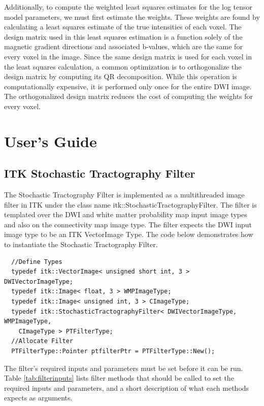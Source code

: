 \documentclass{InsightArticle}
\begin{document}
Additionally, to compute the weighted least squares estimates for the log tensor model parameters, we must first estimate the weights.  These weights are found by calculating a least squares estimate of the true intensities of each voxel.  The design matrix used in this least squares estimation is a function solely of the magnetic gradient directions and associated b-values, which are the same for every voxel in the image.  Since the same design matrix is used for each voxel in the least squares calculation, a common optimization is to orthogonalize the design matrix by computing its QR decomposition.  While this operation is computationally expensive, it is performed only once for the entire DWI image.  The orthogonalized design matrix reduces the cost of computing the weights for every voxel.


\section{User's Guide}

\subsection{ITK Stochastic Tractography Filter}
The Stochastic Tractography Filter is implemented as a multithreaded image filter in ITK under the class name itk::StochasticTractographyFilter.  The filter is templated over the DWI and white matter probability map input image types and also on the connectivity map image type.  The filter expects the DWI input image type to be an ITK VectorImage Type.  The code below demonstrates how to instantiate the Stochastic Tractography Filter.
\begin{verbatim}
  //Define Types
  typedef itk::VectorImage< unsigned short int, 3 > DWIVectorImageType;
  typedef itk::Image< float, 3 > WMPImageType;
  typedef itk::Image< unsigned int, 3 > CImageType;
  typedef itk::StochasticTractographyFilter< DWIVectorImageType, WMPImageType,
    CImageType > PTFilterType;
  //Allocate Filter
  PTFilterType::Pointer ptfilterPtr = PTFilterType::New();
\end{verbatim}

The filter's required inputs and parameters must be set before it can be run.  Table \ref{tab:filterinputs} lists filter methods that should be called to set the required inputs and parameters,  and a short description of what each methods expects as arguments.
\end{document}

